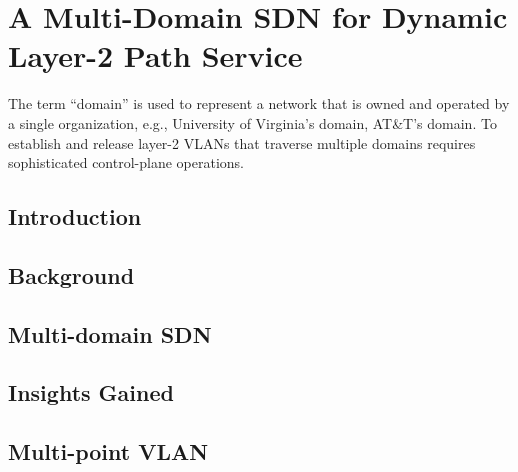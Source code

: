 \chapter{A Multi-Domain SDN for Dynamic Layer-2 Path Service}
\label{sec:DYNES}

The term ``domain'' is used to represent a network that is owned and operated by
a single organization, e.g., University of Virginia's domain, AT\&T's domain.
To establish and release layer-2 VLANs that traverse multiple domains requires sophisticated
control-plane operations.

\section{Introduction}




\section{Background}
\label{sec:control-plane}


\section{Multi-domain SDN}
\label{sec:mdsdn}


\section{Insights Gained}
\label{sec:insights}






\section{Multi-point VLAN}
\label{sec:mdvlan}

